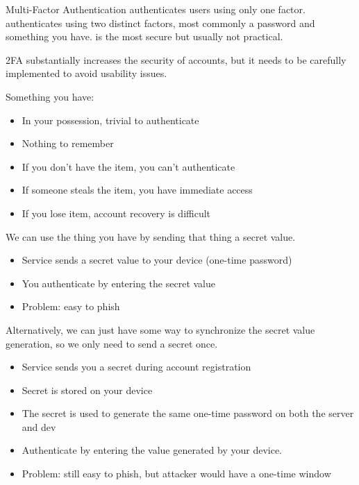 \documentclass[12pt]{report}
\begin{document}
\begin{dfnbox}{Multi-Factor Authentication}{}
     authenticates users using only one factor.  authenticates using two distinct factors, most commonly a password and something you have.  is the most secure but usually not practical.
\end{dfnbox}

2FA substantially increases the security of accounts, but it needs to be carefully implemented to avoid usability issues.

Something you have:
\begin{itemize}[noitemsep]
    \item In your possession, trivial to authenticate
    \item Nothing to remember
    \item If you don't have the item, you can't authenticate
    \item If someone steals the item, you have immediate access
    \item If you lose item, account recovery is difficult
\end{itemize}

We can use the thing you have by sending that thing a secret value.
\begin{itemize}[noitemsep]
    \item Service sends a secret value to your device (one-time password)
    \item You authenticate by entering the secret value
    \item Problem: easy to phish
\end{itemize}

Alternatively, we can just have some way to synchronize the secret value generation, so we only need to send a secret once.
\begin{itemize}[noitemsep]
    \item Service sends you a secret during account registration
    \item Secret is stored on your device
    \item The secret is used to generate the same one-time password on both the server and dev
    \item Authenticate by entering the value generated by your device.
    \item Problem: still easy to phish, but attacker would have a one-time window
\end{itemize}
\end{document}
